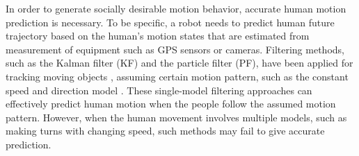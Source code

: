 \documentclass[letterpaper, 10 pt, conference]{ieeeconf}
\newcommand{\todonote}[1]{\vspace{0px} %
	\todo[inline, color=green!30]{\textbf{[Note:]} {#1}} %
}
\newcommand{\todohere}[1]{\hl{(\textbf{TODO:} #1)}}
\begin{document}
	In order to generate socially desirable motion behavior, accurate human motion prediction is necessary.
	To be specific, a robot needs to predict human future trajectory based on the human's motion states that are estimated from measurement of equipment such as GPS sensors or cameras.
	Filtering methods, such as the Kalman filter (KF) and the particle filter (PF), have been applied for tracking moving objects \cite {koller1994robust,rui2001better}, assuming certain motion pattern, such as the constant speed and direction model \cite{svenstrup2010trajectory,bruce2004better}.
	These single-model filtering approaches can effectively predict human motion when the people follow the assumed motion pattern.
	However, when the human movement involves multiple models, such as making turns with changing speed, such methods may fail to give accurate prediction.
	
	
\end{document}
